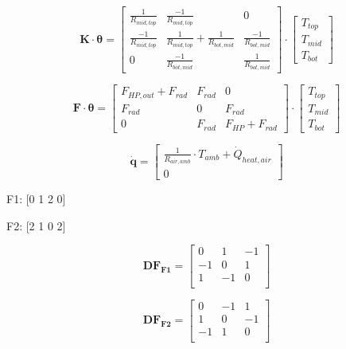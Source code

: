 \begin{equation}
	\mathbf{K} \cdot \boldsymbol{\theta} =
	\begin{bmatrix}
		\frac{1}{R_{mid,top}} & \frac{-1}{R_{mid,top}} & 0\\
		\frac{-1}{R_{mid,top}} &  \frac{1}{R_{mid, top}} + \frac{1}{R_{bot,mid}} & \frac{-1}{R_{bot,mid}}\\
		0 &  \frac{-1}{R_{bot, mid}} & \frac{1}{R_{bot,mid}}
	\end{bmatrix}
	\cdot
	\begin{bmatrix}
		T_{top} \\
		T_{mid} \\
		T_{bot}
	\end{bmatrix}
\end{equation}

\begin{equation}
	\mathbf{F} \cdot \boldsymbol{\theta} =
	\begin{bmatrix}
		F_{HP,out} + F_{rad} & F_{rad} & 0 \\
		F_{rad} &  0  & F_{rad} \\
		0 &  F_{rad} & F_{HP} + F_{rad}
	\end{bmatrix}
	\cdot
	\begin{bmatrix}
		T_{top} \\
		T_{mid} \\
		T_{bot}
	\end{bmatrix}
\end{equation}

\begin{equation}
	\mathbf{\dot{q}} =
	\begin{bmatrix}
		\frac{1}{R_{air, amb}} \cdot T_{amb} + \dot{Q}_{heat, air} \\
		0
	\end{bmatrix}
\end{equation}


F1: [0 1 2 0]

F2: [2 1 0 2]

\begin{equation}
	\mathbf{DF_{F1}} = 
	\begin{bmatrix}
		0 & 1 &-1  \\
		-1 & 0 & 1  \\
		1 &-1 & 0  \\
	\end{bmatrix}
	\label{eq:DFflow1}
\end{equation}

\begin{equation}
	\mathbf{DF_{F2}} = 
	\begin{bmatrix}
		0 &-1 & 1  \\
		1 & 0 &-1  \\
		-1 & 1 & 0  \\
	\end{bmatrix}
	\label{eq:DFflow1}
\end{equation}

